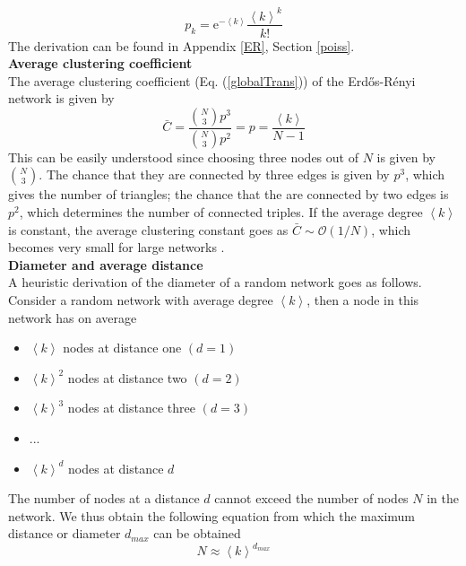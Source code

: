 \documentclass[11 pt , letterpaper , twoside , openright]{book}
\begin{document}
\begin{equation}
	p_k = \mathrm{e}^{-\left<k\right>} \frac{\left<k\right>^k}{k!}
\end{equation}
The derivation can be found in Appendix \ref{ER}, Section \ref{poiss}. \\
\newline
\newline
\newline
\textbf{Average clustering coefficient}\\
\newline
The average clustering coefficient (Eq. (\ref{globalTrans})) of the Erd\H{o}s-R\'{e}nyi network is given by \cite{Clauset2011}
\begin{equation}\label{C}
	\bar{C} = \frac{\binom{N}{3}p^3}{\binom{N}{3}p^2} = p = \frac{\left<k\right>}{N-1}
\end{equation}
This can be easily understood since choosing three nodes out of $N$ is given by $\binom{N}{3}$. The chance that they are connected by three edges is given by $p^3$, which gives the number of triangles; the chance that the are connected by two edges is $p^2$, which determines the number of connected triples. If the average degree $\left<k\right>$ is constant, the average clustering constant goes as $\bar{C} \sim \mathcal{O}(1/N)$, which becomes very small for large networks \cite{Clauset2011}. \\
\newline
\textbf{Diameter and average distance}\\
\newline
A heuristic derivation of the diameter of a random network goes as follows. Consider a random network with average degree $\left<k\right>$, then a node in this network has on average \cite{Albert2014}
\begin{itemize}
	\item $\left<k\right>$ nodes at distance one $(d=1)$
	\item $\left<k\right>^2$ nodes at distance two $(d=2)$
	\item $\left<k\right>^3$ nodes at distance three $(d=3)$
	\item ...
	\item $\left<k\right>^d$ nodes at distance $d$
\end{itemize}
The number of nodes at a distance $d$ cannot exceed the number of nodes $N$ in the network. We thus obtain the following equation from which the maximum distance or diameter $d_{max}$ can be obtained
\begin{equation}
	N \approx \left<k\right>^{d_{max}}
\end{equation}
\end{document}
